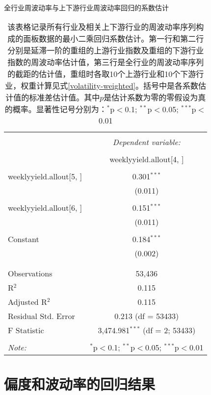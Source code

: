 \documentclass{sysuthesis}
\begin{document}
\begin{table}[!htbp] \centering 
\caption{全行业周波动率与上下游行业周波动率回归的系数估计} 
  \caption*{\footnotesize 该表格记录所有行业及相关上下游行业的周波动率序列构成的面板数据的最小二乘回归系数估计。第一行和第二行分别是延滞一阶的重组的上游行业指数及重组的下游行业指数的周波动率估计值，第三行是全行业的周波动率序列的截距的估计值，重组时各取10个上游行业和10个下游行业，权重计算见式\ref{volatility-weighted}。括号中是各系数估计值的标准差估计值。其中$p$是估计系数为零的零假设为真的概率。显著性记号分别为：{$^{*}$p$<$0.1; $^{**}$p$<$0.05; $^{***}$p$<$0.01}} 
  \renewcommand{\arraystretch}{0.5}
\begin{tabular}{@{\extracolsep{5pt}}lc} 
\\[-1.8ex]\hline 
\hline \\[-1.8ex] 
 & \multicolumn{1}{c}{\textit{Dependent variable:}} \\ 
\cline{2-2} 
\\[-1.8ex] & weeklyyield.allout[4, ] \\ 
\hline \\[-1.8ex] 
 weeklyyield.allout[5, ] & 0.301$^{***}$ \\ 
  & (0.011) \\ 
  & \\ 
 weeklyyield.allout[6, ] & 0.151$^{***}$ \\ 
  & (0.011) \\ 
  & \\ 
 Constant & 0.184$^{***}$ \\ 
  & (0.002) \\ 
  & \\ 
\hline \\[-1.8ex] 
Observations & 53,436 \\ 
R$^{2}$ & 0.115 \\ 
Adjusted R$^{2}$ & 0.115 \\ 
Residual Std. Error & 0.213 (df = 53433) \\ 
F Statistic & 3,474.981$^{***}$ (df = 2; 53433) \\ 
\hline 
\hline \\[-1.8ex] 
\textit{Note:}  & \multicolumn{1}{r}{$^{*}$p$<$0.1; $^{**}$p$<$0.05; $^{***}$p$<$0.01} \\ 
\end{tabular} 
\end{table} 


\chapter{偏度和波动率的回归结果}
\end{document}
